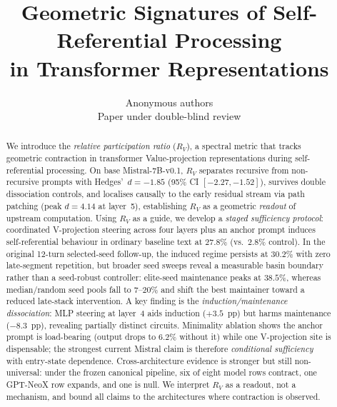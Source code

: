 \documentclass{article}
\title{Geometric Signatures of Self-Referential Processing\\
       in Transformer Representations}
\author{Anonymous authors\\Paper under double-blind review}
\newcommand{\RV}{R_V}
\newcommand{\dcohen}{d}
\begin{document}
\ifcolmsubmission
\linenumbers
\fi

\maketitle

\begin{abstract}
We introduce the \emph{relative participation ratio} ($\RV$), a spectral metric
that tracks geometric contraction in transformer Value-projection representations
during self-referential processing.
On base Mistral-7B-v0.1, $\RV$ separates recursive from non-recursive prompts
with Hedges'~$\dcohen = -1.85$ (95\% CI $[-2.27, -1.52]$), survives double
dissociation controls, and localises causally to the early residual stream via
path patching (peak $\dcohen = 4.14$ at layer~5), establishing $\RV$ as a
geometric \emph{readout} of upstream computation.
Using $\RV$ as a guide, we develop a \emph{staged sufficiency protocol}:
coordinated V-projection steering across four layers plus an anchor prompt
induces self-referential behaviour in ordinary baseline text at $27.8\%$
(vs.\ $2.8\%$ control).
In the original 12-turn selected-seed follow-up, the induced regime persists at
$30.2\%$ with zero late-segment repetition, but broader seed sweeps reveal a
measurable basin boundary rather than a seed-robust controller: elite-seed
maintenance peaks at $38.5\%$, whereas median/random seed pools fall to
$7$--$20\%$ and shift the best maintainer toward a reduced late-stack
intervention.
A key finding is the \emph{induction/maintenance dissociation}:
MLP steering at layer~4 aids induction ($+3.5$~pp) but harms maintenance
($-8.3$~pp), revealing partially distinct circuits.
Minimality ablation shows the anchor prompt is load-bearing (output drops to
$6.2\%$ without it) while one V-projection site is dispensable;
the strongest current Mistral claim is therefore \emph{conditional sufficiency}
with entry-state dependence.
Cross-architecture evidence is stronger but still non-universal: under the
frozen canonical pipeline, six of eight model rows contract, one GPT-NeoX row
expands, and one is null.
We interpret $\RV$ as a readout, not a mechanism, and bound all claims to
the architectures where contraction is observed.
\end{abstract}


\end{document}
